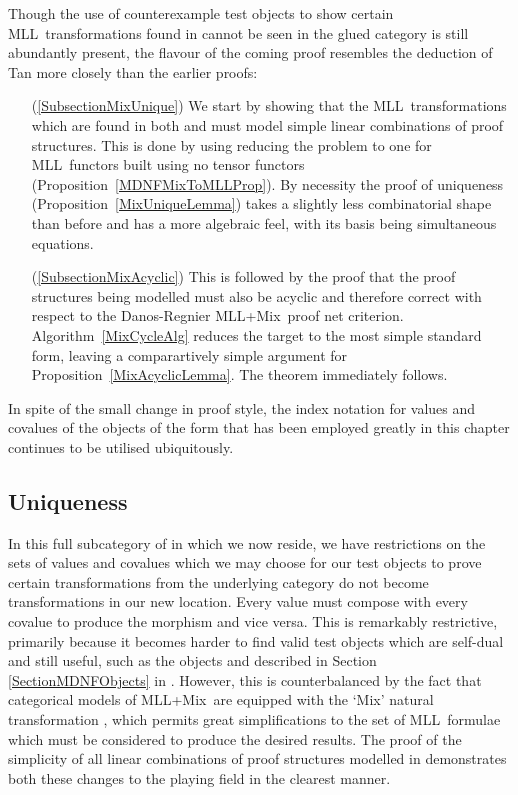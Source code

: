 \documentclass{LMCS}
\theoremstyle{plain}\newtheorem*{cLm}{Claim}
\newcommand{\mll}{MLL} \newcommand{\mall}{MALL}
\newcommand{\mllmix}{MLL+Mix} \newcommand{\GRel}{\mathbf{GRel}}
\begin{document}
     Though the use of counterexample test objects to show certain \mll~transformations found in  cannot be seen in the glued category is still abundantly present, the flavour of the coming proof resembles the deduction of Tan more closely than the earlier proofs:
     \begin{enumerate}[label=(\autoref{SubsectionMixUnique})]
     \item[(\autoref{SubsectionMixUnique})] We start by showing that the \mll~transformations which are found in both  and  must model simple linear combinations of proof structures. This is done by using reducing the problem to one for \mll~functors built using no tensor functors (Proposition~\ref{MDNFMixToMLLProp}). By necessity the proof of uniqueness (Proposition~\ref{MixUniqueLemma}) takes a slightly less combinatorial shape than before and has a more algebraic feel, with its basis being simultaneous equations.
     \item[(\autoref{SubsectionMixAcyclic})] This is followed by the proof that the proof structures being modelled must also be acyclic and therefore correct with respect to the Danos-Regnier \mllmix~proof net criterion. Algorithm~\ref{MixCycleAlg} reduces the target to the most simple standard form, leaving a comparartively simple argument for Proposition~\ref{MixAcyclicLemma}. The theorem immediately follows.
     \end{enumerate}
     In spite of the small change in proof style, the index notation for values and covalues of the objects of the form  that has been employed greatly in this chapter continues to be utilised ubiquitously.
    
    \subsection{Uniqueness} \label{SubsectionMixUnique}
    
    In this full subcategory of  in which we now reside, we have restrictions on the sets of values and covalues which we may choose for our test objects to prove certain transformations from the underlying category do not become transformations in our new location. Every value must compose with every covalue to produce the morphism  and vice versa. This is remarkably restrictive, primarily because it becomes harder to find valid test objects which are self-dual and still useful, such as the objects  and  described in Section \ref{SectionMDNFObjects} in . However, this is counterbalanced by the fact that categorical models of \mllmix\ are equipped with the `Mix' natural transformation , which permits great simplifications to the set of \mll~formulae which must be considered to produce the desired results. The proof of the simplicity of all linear combinations of proof structures modelled in  demonstrates both these changes to the playing field in the clearest manner.
    
\end{document}
